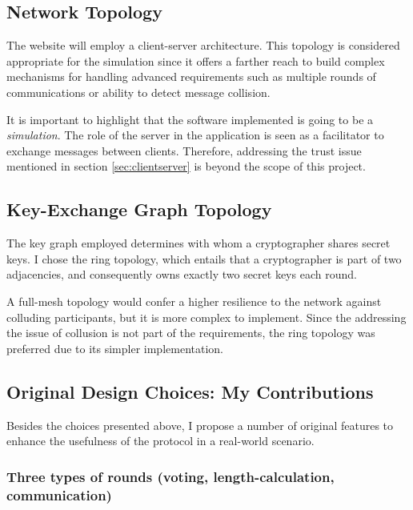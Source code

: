 \subsection{Network Topology}
The website will employ a client-server architecture. This topology is considered appropriate for the simulation since it offers a farther reach to build complex mechanisms for handling advanced requirements such as multiple rounds of communications or ability to detect message collision.

It is important to highlight that the software implemented is going to be a \emph{simulation}. The role of the server in the application is seen as a facilitator to exchange messages between clients. Therefore, addressing the trust issue mentioned in section \ref{sec:clientserver} is beyond the scope of this project.


\subsection{Key-Exchange Graph Topology}
The key graph employed determines with whom a cryptographer shares secret keys. I chose the ring topology, which entails that a cryptographer is part of two adjacencies, and consequently owns exactly two secret keys each round. 

A full-mesh topology would confer a higher resilience to the network against colluding participants, but it is more complex to implement. Since the addressing the issue of collusion is not part of the requirements, the ring topology was preferred due to its simpler implementation.


\subsection{Original Design Choices: My Contributions}
Besides the choices presented above, I propose a number of original features to enhance the usefulness of the protocol in a real-world scenario.







\subsubsection{Three types of rounds (voting, length-calculation, communication)} \label{sec:threeRoundTypes}

